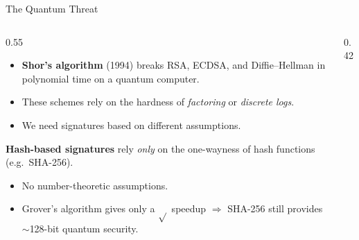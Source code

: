\documentclass[aspectratio=169, 10pt]{beamer}
\begin{document}
\begin{frame}{The Quantum Threat}
\begin{columns}
\begin{column}{0.55\textwidth}
\begin{itemize}
    \item \textbf{Shor's algorithm} (1994) breaks RSA, ECDSA, and Diffie--Hellman in polynomial time on a quantum computer.
    \item These schemes rely on the hardness of \emph{factoring} or \emph{discrete logs}.
    \item \alert{We need signatures based on different assumptions.}
\end{itemize}
\vspace{6pt}
\textbf{Hash-based signatures} rely \emph{only} on the one-wayness of hash functions (e.g.\ SHA-256).
\begin{itemize}
    \item No number-theoretic assumptions.
    \item Grover's algorithm gives only a \(\sqrt{}\) speedup \(\Rightarrow\) SHA-256 still provides \(\sim\)128-bit quantum security.
\end{itemize}
\end{column}
\begin{column}{0.42\textwidth}
\centering
{}
\end{column}
\end{columns}
\end{frame}
\end{document}

